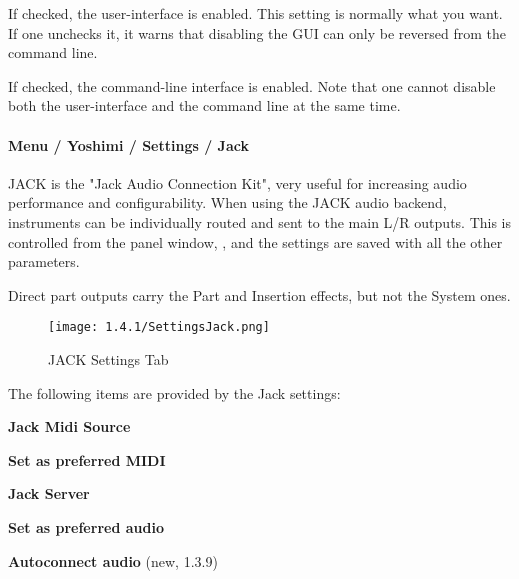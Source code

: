    If checked, the user-interface is enabled.  This setting is normally what you
   want.  If one unchecks it, it warns that disabling the GUI
   can only be reversed from the command line.

   If checked, the command-line interface is enabled.
   Note that one cannot disable both the user-interface and the command line
   at the same time.

\paragraph{Menu / Yoshimi / Settings / Jack}
\label{paragraph:menu_yoshimi_settings_jack}

   JACK is the "Jack Audio Connection Kit", very useful for increasing audio
   performance and configurability.
   When using the JACK audio backend, instruments can be individually routed
   and sent to the main L/R outputs. This is controlled from the
   panel window,
   ,
   and the settings are saved with all the other parameters.

   Direct part outputs carry the Part and Insertion effects, but not the
   System ones.

\begin{figure}[H]
   \centering 
   \texttt{[image: 1.4.1/SettingsJack.png]}
   \caption[JACK Settings]{JACK Settings Tab}
   \label{fig:yoshimi_settings_jack_tab}
\end{figure}

   The following items are provided by the Jack settings:

   \begin{enumber}
      \item \textbf{Jack Midi Source}
      \item \textbf{Set as preferred MIDI}
      \item \textbf{Jack Server}
      \item \textbf{Set as preferred audio}
      \item \textbf{Autoconnect audio} (new, 1.3.9)
   \end{enumber}

   \setcounter{ItemCounter}{0}      %

